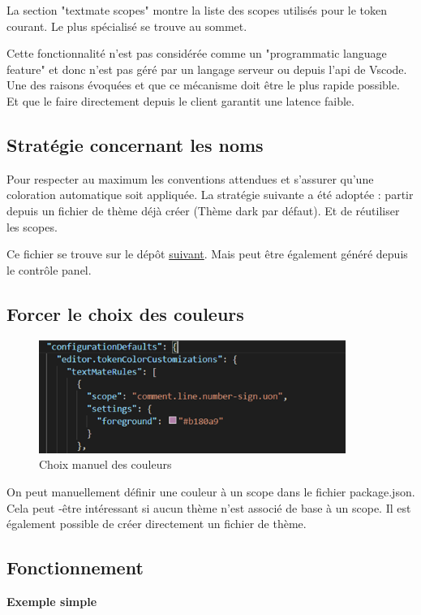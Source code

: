 \documentclass[
    iict, %
    il, %
]{heig-tb}
\begin{document}
La section "textmate scopes" montre la liste des scopes utilisés pour le token courant. Le plus spécialisé se trouve au sommet.

Cette fonctionnalité n'est pas considérée comme un "programmatic language feature" et donc n'est pas géré par un langage serveur ou depuis l'api de Vscode. Une des raisons évoquées et que ce mécanisme doit être le plus rapide possible. Et que le faire directement depuis le client garantit une latence faible.

\subsection{Stratégie concernant les noms}
Pour respecter au maximum les conventions attendues et s'assurer qu'une coloration automatique soit appliquée. La stratégie suivante a été adoptée : partir depuis un fichier de thème déjà créer (Thème dark par défaut). Et de réutiliser les scopes.

Ce fichier se trouve sur le dépôt \href{https://github.com/microsoft/vscode/blob/main/extensions/theme-defaults/themes/dark_vs.json}{suivant}.
Mais peut être également généré depuis le contrôle panel.

\subsection{Forcer le choix des couleurs}
\begin{figure}[!ht]
    \begin{center}
        \includegraphics[width=10cm]{assets/figures/manual-settings-color.png}
    \end{center}
    \caption[Choix manuel des couleurs]{\label{manual-settings-color} Choix manuel des couleurs}
\end{figure}

On peut manuellement définir une couleur à un scope dans le fichier package.json.
Cela peut -être intéressant si aucun thème n'est associé de base à un scope.
Il est également possible de créer directement un fichier de thème.

\subsection{Fonctionnement}
\textbf{Exemple simple}
\end{document}
